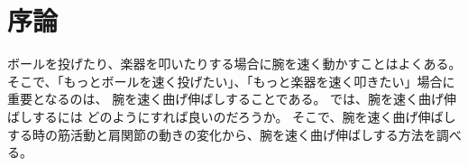 \documentclass{jsarticle}
\begin{document}
\section{序論}
ボールを投げたり、楽器を叩いたりする場合に腕を速く動かすことはよくある。そこで、「もっとボールを速く投げたい」、「もっと楽器を速く叩きたい」場合に重要となるのは、
腕を速く曲げ伸ばしすることである。
では、腕を速く曲げ伸ばしするには
どのようにすれば良いのだろうか。
そこで、腕を速く曲げ伸ばしする時の筋活動と肩関節の動きの変化から、腕を速く曲げ伸ばしする方法を調べる。
\end{document}
